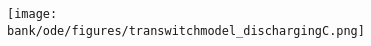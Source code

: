 \begin{figure}[H]
  \begin{center}
    \texttt{[image: \\bank/ode/figures/transwitchmodel\_dischargingC.png]}
  \end{center}
  \label{fig:discharging_capacitor}
\end{figure}
